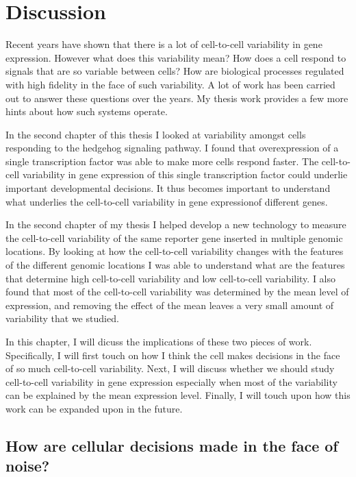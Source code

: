 \chapter{Discussion}
\label{chap:conclusion}
\tightlists

Recent years have shown that there is a lot of cell-to-cell variability in gene expression. However what does this variability mean? How does a cell respond to signals that are so variable between cells? How are biological processes regulated with high fidelity in the face of such variability. A lot of work has been carried out to answer these questions over the years. My thesis work provides a few more hints about how such systems operate.

In the second chapter of this thesis I looked at variability amongst cells responding to the hedgehog signaling pathway. I found that overexpression of a single transcription factor was able to make more cells respond faster. The cell-to-cell variability in gene expression of this single transcription factor could underlie important developmental decisions. It thus becomes important to understand what underlies the cell-to-cell variability in gene expressionof different genes.

In the second chapter of my thesis I helped develop a new technology to measure the cell-to-cell variability of the same reporter gene inserted in multiple genomic locations. By looking at how the cell-to-cell variability changes with the features of the different genomic locations I was able to understand what are the features that determine high cell-to-cell variability and low cell-to-cell variability. I also found that most of the cell-to-cell variability was determined by the mean level of expression, and removing the effect of the mean leaves a very small amount of variability that we studied.

In this chapter, I will dicuss the implications of these two pieces of work. Specifically, I will first touch on how I think the cell makes decisions in the face of so much cell-to-cell variability. Next, I will discuss whether we should study cell-to-cell variability in gene expression especially when most of the variability can be explained by the mean expression level. Finally, I will touch upon how this work can be expanded upon in the future.

\section{How are cellular decisions made in the face of noise?}

